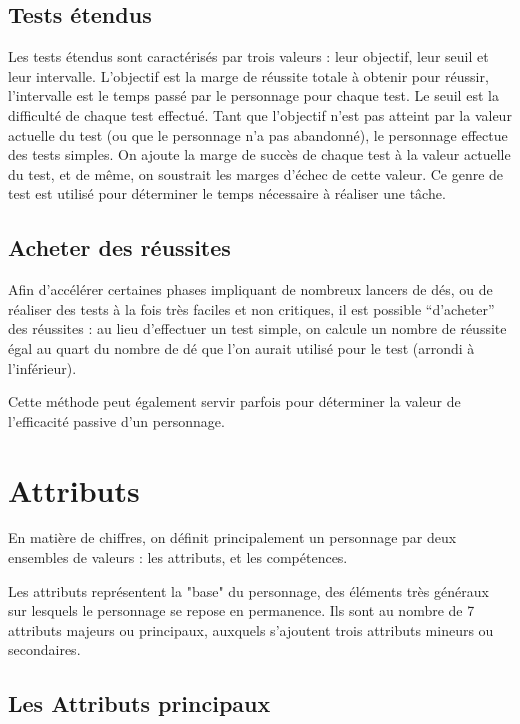 \documentclass[10pt,a4paper,twocolumn]{book}
\begin{document}
\section{Tests étendus}
Les tests étendus sont caractérisés par trois valeurs : leur objectif, leur seuil et leur intervalle.
L’objectif est la marge de réussite totale à obtenir pour réussir, l’intervalle est le temps passé par le personnage pour chaque test. Le seuil est la difficulté de chaque test effectué.
Tant que l’objectif n’est pas atteint par la valeur actuelle du test (ou que le personnage n’a pas abandonné), le personnage effectue des tests simples. On ajoute la marge de succès de chaque test à la valeur actuelle du test, et de même, on soustrait les marges d’échec de cette valeur. 
Ce genre de test est utilisé pour déterminer le temps nécessaire à réaliser une tâche.
\section{Acheter des réussites}
Afin d’accélérer certaines phases impliquant de nombreux lancers de dés, ou de réaliser des tests à la fois très faciles et non critiques, il est possible “d’acheter” des réussites : au lieu d’effectuer un test simple, on calcule un nombre de réussite égal au quart du nombre de dé que l’on aurait utilisé pour le test (arrondi à l’inférieur).

Cette méthode peut également servir parfois pour déterminer la valeur de l'efficacité passive d'un personnage.
\chapter{Attributs}
En matière de chiffres, on définit principalement un personnage par deux ensembles de valeurs : les attributs, et les compétences.

Les attributs représentent la "base" du personnage, des éléments très généraux sur lesquels le personnage se repose en permanence. Ils sont au nombre de 7 attributs majeurs ou principaux, auxquels s'ajoutent trois attributs mineurs ou secondaires.
\section{Les Attributs principaux}
\end{document}
